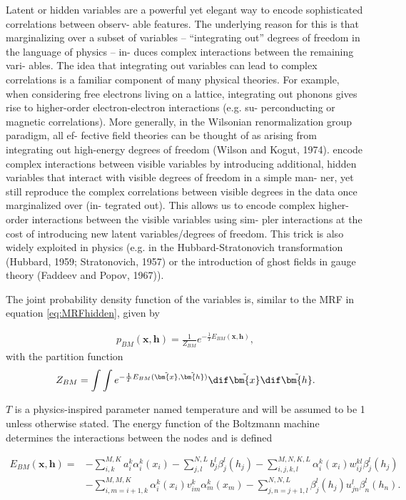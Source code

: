 Latent or hidden variables are a powerful yet elegant way to encode
sophisticated correlations between observ- able features. The
underlying reason for this is that marginalizing over a subset of
variables – “integrating out” degrees of freedom in the language of
physics – in- duces complex interactions between the remaining vari-
ables. The idea that integrating out variables can lead to complex
correlations is a familiar component of many physical theories. For
example, when considering free electrons living on a lattice,
integrating out phonons gives rise to higher-order electron-electron
interactions (e.g. su- perconducting or magnetic correlations). More
generally, in the Wilsonian renormalization group paradigm, all ef-
fective field theories can be thought of as arising from integrating
out high-energy degrees of freedom (Wilson and Kogut, 1974).
encode complex interactions between visible variables by introducing
additional, hidden variables that interact with visible degrees of
freedom in a simple man- ner, yet still reproduce the complex
correlations between visible degrees in the data once marginalized
over (in- tegrated out). This allows us to encode complex higher-
order interactions between the visible variables using sim- pler
interactions at the cost of introducing new latent variables/degrees
of freedom. This trick is also widely exploited in physics (e.g. in
the Hubbard-Stratonovich transformation (Hubbard, 1959; Stratonovich,
1957) or the introduction of ghost fields in gauge theory (Faddeev and
Popov, 1967)).

The joint probability density function of the variables is, similar to
the MRF in equation \ref{eq:MRFhidden}, given by

\begin{align}
	p_{BM}(\bm{x}, \bm{h}) = \frac{1}{Z_{BM}} e^{-\frac{1}{T}E_{BM}(\bm{x}, \bm{h})} ,
\end{align}
with the partition function 
\begin{align}
	Z_{BM} = \int \int e^{-\frac{1}{T} E_{BM}(\tilde{\bm{x}}, \tilde{\bm{h}})} \dif \tilde{\bm{x}} \dif \tilde{\bm{h}} .
\end{align}

$T$ is a physics-inspired parameter named temperature and will be assumed to be 1 unless otherwise stated. The energy function of the Boltzmann machine determines the interactions between the nodes and is defined  

\begin{align}
	E_{BM}(\bm{x}, \bm{h}) =& - \sum_{i, k}^{M, K} a_i^k \alpha_i^k (x_i)
	- \sum_{j, l}^{N, L} b_j^l \beta_j^l (h_j) 
	- \sum_{i,j,k,l}^{M,N,K,L} \alpha_i^k (x_i) w_{ij}^{kl} \beta_j^l (h_j) \nonumber \\
	&- \sum_{i, m=i+1, k}^{M, M, K} \alpha_i^k (x_i) v_{im}^k \alpha_m^k (x_m)
	- \sum_{j,n=j+1,l}^{N,N,L} \beta_j^l (h_j) u_{jn}^l \beta_n^l (h_n).
\end{align}

